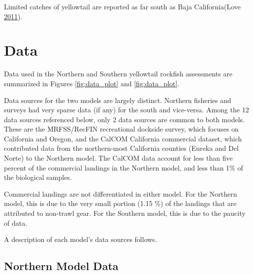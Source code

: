 \documentclass[12pt,]{article}
\begin{document}
Limited catches of yellowtail are reported as far south as Baja
California(Love \protect\hyperlink{ref-Love2011}{2011}).

\newpage

\captionsetup[table]{labelformat=empty,justification=raggedright,font=bf, singlelinecheck=false}

\section{Data}\label{data}

Data used in the Northern and Southern yellowtail rockfish assessments
are summarized in Figures \ref{fig:data_plot} and \ref{fig:data_plot}.

Data sources for the two models are largely distinct. Northern fisheries
and surveys had very sparse data (if any) for the south and vice-versa.
Among the 12 data sources referenced below, only 2 data sources are
common to both models. These are the MRFSS/RecFIN recreational dockside
survey, which focuses on California and Oregon, and the CalCOM
California commercial dataset, which contributed data from the
northern-most California counties (Eureka and Del Norte) to the Northern
model. The CalCOM data account for less than five percent of the
commercial landings in the Northern model, and less than 1\% of the
biological samples.

Commercial landings are not differentiated in either model. For the
Northern model, this is due to the very small portion (1.15 \%) of the
landings that are attributed to non-trawl gear. For the Southern model,
this is due to the paucity of data.

A description of each model's data sources follows.

\subsection{Northern Model Data}\label{northern-model-data}

\vspace{.5cm}
\end{document}
